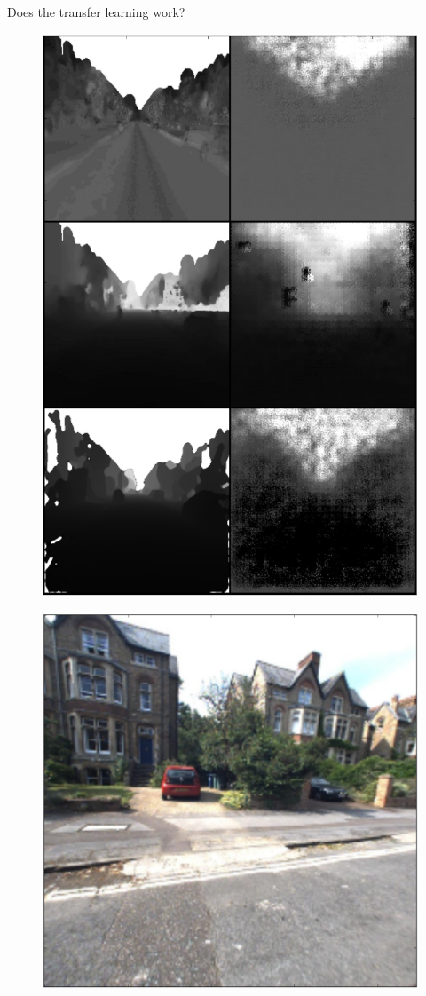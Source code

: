 \begin{frame}{Does the transfer learning work?}
\begin{minipage}[c]{0.24\linewidth}
\begin{figure}[c]
			\includegraphics[width=\linewidth]{images/mod4.png}			
		\end{figure}
	\end{minipage}
	\hfill
	\begin{minipage}[c]{0.24\linewidth}
		\begin{figure}[c]
			\includegraphics[width=0.5\linewidth]{images/rgb5.png}
		

\end{figure}
\end{minipage}
\end{frame}
